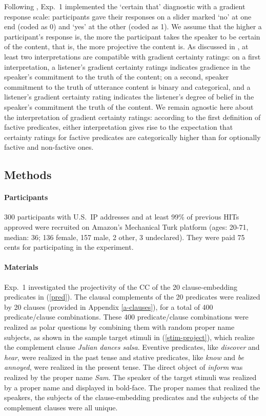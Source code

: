 \documentclass[11pt,fleqn]{article}
\newcommand{\6}{\mbox{$[\hspace*{-.6mm}[$}}
\newcommand{\9}{\mbox{$]\hspace*{-.6mm}]$}}
\begin{document}
Following \citealt{tbd-variability}, Exp.~1 implemented the `certain that' diagnostic with a gradient response scale: participants gave their responses on a slider marked `no' at one end (coded as 0) and `yes' at the other (coded as 1). We assume that the higher a participant's response is, the more the participant takes the speaker to be certain of the content, that is, the more projective the content is. As discussed in \citealt{tbd-variability}, at least two interpretations are compatible with gradient certainty ratings: on a first interpretation, a listener's gradient certainty ratings indicates gradience in the speaker's commitment to the truth of the content; on a second, speaker commitment to the truth of utterance content is binary and categorical, and a listener's gradient certainty rating indicates the listener's degree of belief in the speaker's commitment the truth of the content. We remain agnostic here about the interpretation of gradient certainty ratings:  according to the first definition of factive predicates, either interpretation gives rise to the expectation that certainty ratings for factive predicates are categorically higher than for optionally factive and non-factive ones.
 
\subsection{Methods}

\paragraph{Participants} 300 participants with U.S.\ IP addresses and at least 99\% of previous HITs approved were recruited on Amazon's Mechanical Turk platform (ages: 20-71, median: 36; 136 female, 157 male, 2 other, 3 undeclared). They were paid 75 cents for participating in the experiment.

\paragraph{Materials} Exp.~1 investigated the projectivity of the CC of the 20 clause-embedding predicates in (\ref{pred}).  The clausal complements of the 20 predicates were realized by 20 clauses (provided in Appendix \ref{a-clauses}), for a total of 400 predicate/clause combinations. These 400 predicate/clause combinations were realized as polar questions by combining them with random proper name subjects, as shown in the sample target stimuli in (\ref{stim-project}), which realize the complement clause {\em Julian dances salsa}. Eventive predicates, like {\em discover} and {\em hear}, were realized in the past tense and stative predicates, like {\em know} and {\em be annoyed}, were realized in the present tense. The direct object of {\em inform} was realized by the proper name {\em Sam}.  The speaker of the target stimuli was realized by a proper name and displayed in bold-face. The proper names that realized the speakers, the subjects of the clause-embedding predicates and the subjects of the complement clauses were all unique.
\end{document}
